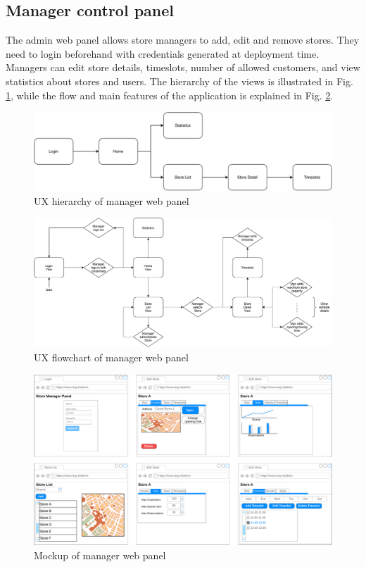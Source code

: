 \subsection{Manager control panel}

The admin web panel allows store managers to add, edit and remove stores.
They need to login beforehand with credentials generated at deployment time.
Managers can edit store details, timeslots, number of allowed customers, and view statistics about stores and users. The hierarchy of the views is illustrated in Fig. \ref{fig:ux_manager_hierarchy}, while the flow and main features of the application is explained in Fig. \ref{fig:ux_manager_flowchart}.

\begin{figure}[H]
    \centering
    \includegraphics[width=\linewidth]{images/draw.io/ux_manager.pdf}
    \caption{UX hierarchy of manager web panel}
    \label{fig:ux_manager_hierarchy}
\end{figure}

\begin{figure}[H]
    \centering
    \includegraphics[width=\linewidth]{images/draw.io/ux_manager_flowchart.pdf}
    \caption{UX flowchart of manager web panel}
    \label{fig:ux_manager_flowchart}
\end{figure}

\begin{figure}[H]
    \centering
    \includegraphics[width=\linewidth]{images/draw.io/admin_mockup.pdf}
    \caption{Mockup of manager web panel}
    \label{fig:admin_mockup}
\end{figure}